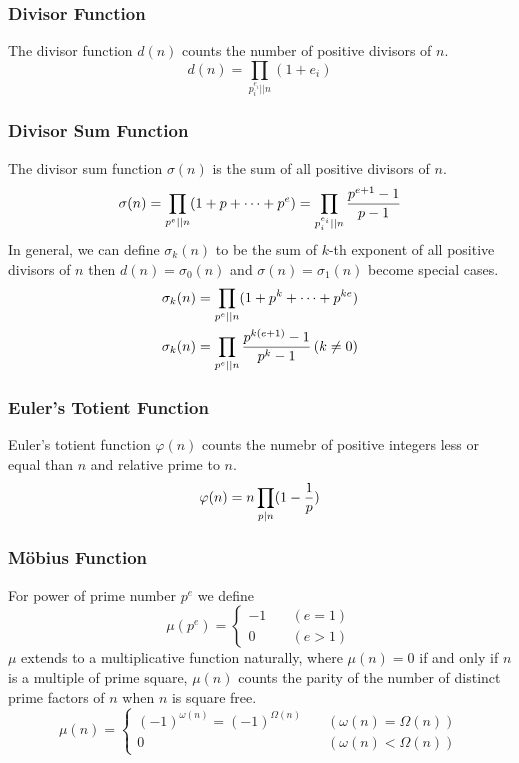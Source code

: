 \documentclass{article}
\begin{document}
\subsubsection*{Divisor Function}
The divisor function $d(n)$ counts the number of positive divisors of $n$.
$$d(n) = \prod_{p_i^{e_i} \vert\vert n} (1 + e_i)$$

\subsubsection*{Divisor Sum Function}
The divisor sum function $\sigma(n)$ is the sum of all positive divisors of $n$.
\begin{equation*}
\sigma(n) = \prod_{{p^e} \vert\vert n} (1 + p + \cdots + p^e)
= \prod_{p_i^{e_i} \vert\vert n} {p^{e + 1} - 1 \over p - 1}
\end{equation*}
In general, we can define $\sigma_k(n)$ to be the sum of $k$-th exponent of all
positive divisors of $n$ then $d(n) = \sigma_0(n)$ and $\sigma(n) = \sigma_1(n)$
become special cases.
\begin{align*}
\sigma_k(n) &= \prod_{p^e \vert\vert n} (1 + p^k + \cdots + p^{ke}) \\
\sigma_k(n) &= \prod_{p^e \vert\vert n} {p^{k(e + 1)} - 1 \over p^k - 1} \, (k \neq 0)
\end{align*}

\subsubsection*{Euler's Totient Function}
Euler's totient function $\varphi(n)$ counts the numebr of positive integers less or equal than
$n$ and relative prime to $n$.
$$\varphi(n) = n \prod_{p \vert n} (1 - {1 \over p})$$


\subsubsection*{M\"obius Function}
For power of prime number $p^e$ we define
\begin{equation*}
\mu(p^e) =
\begin{cases}
  -1 & \quad (e = 1) \\
  0  & \quad (e > 1)
\end{cases}
\end{equation*}
$\mu$ extends to a multiplicative function naturally, where $\mu(n) = 0$ if and only if $n$
is a multiple of prime square, $\mu(n)$ counts the parity of the number of distinct prime
factors of $n$ when $n$ is square free.
\begin{equation*}
\mu(n) =
\begin{cases}
  (-1)^{\omega(n)} = (-1)^{\Omega(n)} \quad & (\omega(n) = \Omega(n)) \\
  0 & (\omega(n) < \Omega(n))
\end{cases}
\end{equation*}
\end{document}
